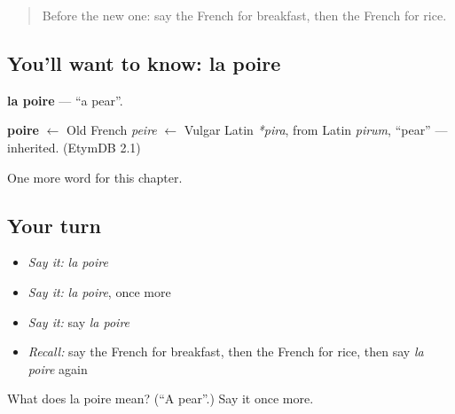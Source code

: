 \label{lesson:FR-C70-poire}



\begin{quote}
Before the new one: say the French for breakfast, then the French for rice.
\end{quote}

\subsection*{You'll want to know: la poire}
\textbf{la poire} — \textquotedblleft{}a pear\textquotedblright{}.

\begin{cousinweb}
\textbf{poire} $\leftarrow$ Old French \emph{peire} $\leftarrow$ Vulgar Latin \emph{*pira}, from Latin \emph{pirum}, \textquotedblleft{}pear\textquotedblright{} — inherited. (EtymDB 2.1)
\end{cousinweb}

\begin{grammarlens}[title={What you've built}]
One more word for this chapter.
\end{grammarlens}

\subsection*{Your turn}
\begin{itemize}
\raggedright
  \item \emph{Say it:} \emph{la poire}
  \item \emph{Say it:} \emph{la poire}, once more
  \item \emph{Say it:} say \emph{la poire}
  \item \emph{Recall:} say the French for breakfast, then the French for rice, then say \emph{la poire} again
\end{itemize}

\begin{tcolorbox}[breakable,colback=teal!4,colframe=teal!35!black,title={Before you move on}]
What does la poire mean? (\textquotedblleft{}A pear\textquotedblright{}.) Say it once more.
\end{tcolorbox}
